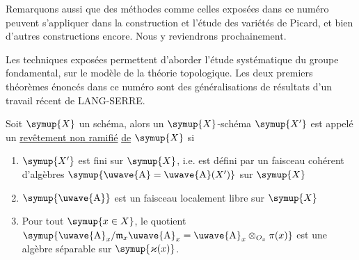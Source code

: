 Remarquons aussi que des méthodes comme celles exposées dans ce numéro peuvent
s'appliquer dans la construction et l'étude des variétés de Picard, et bien
d'autres constructions encore. Nous y reviendrons prochainement.


Les techniques exposées permettent d'aborder l'étude systématique du groupe
fondamental, sur le modèle de la théorie topologique. Les deux premiers
théorèmes énoncés dans ce numéro sont des généralisations de résultats d'un
travail récent de LANG-SERRE.

Soit $\symup{X}$ un schéma, alors un $\symup{X}$-schéma $\symup{X'}$ est appelé un \uline{revêtement non
ramifié}
\uline{de} $\symup{X}$ si
\begin{enumerate}
  \item[\textnormal{i.}] $\symup{X'}$ est fini sur $\symup{X}$, i.e. est défini par un faisceau
    cohérent d'algèbres $\symup{\text{\uwave{A}}=\text{\uwave{A}}(X')}$ sur $\symup{X}$
  \item[\textnormal{ii.}] $\symup{\text{\uwave{A}}}$ est un faisceau localement libre sur $\symup{X}$
  \item[\textnormal{iii.}] Pour tout $\symup{x\in X}$, le quotient
    $\symup{\text{\uwave{A}}_x/\mathfrak m_x\text{\uwave{A}}_x =\text{\uwave{A}}_x\otimes_{O_x}\pi(x)}$
    est une algèbre séparable sur $\symup{\varkappa(x)}$.
\end{enumerate}

